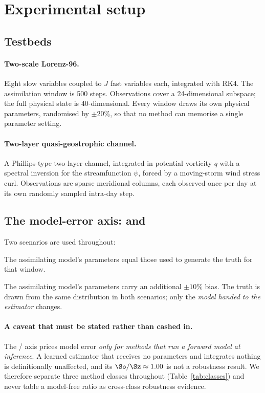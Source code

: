 \section{Experimental setup}
\label{sec:setup}

\subsection{Testbeds}

\paragraph{Two-scale Lorenz-96.}
Eight slow variables coupled to $J$ fast variables each, integrated with RK4.
The assimilation window is 500 steps. Observations cover a 24-dimensional
subspace; the full physical state is 40-dimensional. Every window draws its own
physical parameters, randomised by $\pm 20\%$, so that no method can memorise a
single parameter setting.

\paragraph{Two-layer quasi-geostrophic channel.}
A Phillips-type two-layer channel, integrated in potential vorticity $q$ with a
spectral inversion for the streamfunction $\psi$, forced by a moving-storm wind
stress curl. Observations are sparse meridional columns, each observed once per
day at its own randomly sampled intra-day step.

\subsection{The model-error axis: \Sz{} and \So{}}
\label{sec:s0s1}

Two scenarios are used throughout:
\begin{description}[leftmargin=2em,style=nextline]
  \item[\Sz{} (perfect model).] The assimilating model's parameters equal those
    used to generate the truth for that window.
  \item[\So{} (model error).] The assimilating model's parameters carry an
    additional $\pm 10\%$ bias. The truth is drawn from the same distribution in
    both scenarios; only the \emph{model handed to the estimator} changes.
\end{description}

\paragraph{A caveat that must be stated rather than cashed in.}
The \Sz{}/\So{} axis prices model error \emph{only for methods that run a forward
model at inference}. A learned estimator that receives no parameters and
integrates nothing is definitionally unaffected, and its $\So/\Sz \approx 1.00$
is not a robustness result. We therefore separate three method classes
throughout (Table~\ref{tab:classes}) and never table a model-free ratio as
cross-class robustness evidence.

